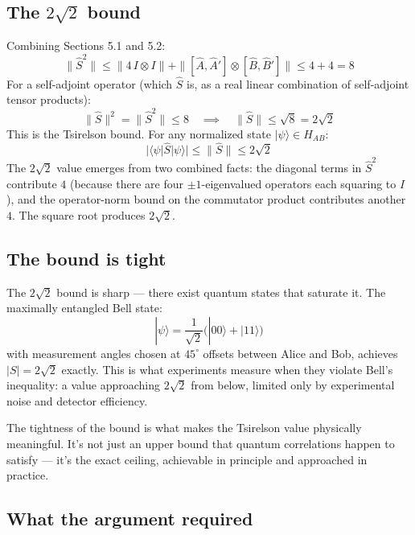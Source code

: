 \documentclass[11pt,a4paper]{article}
\begin{document}
\subsection{The $2\sqrt{2}$ bound}

Combining Sections 5.1 and 5.2:
\[
\|\hat{S}^2\| \leq \|4\, I \otimes I\| + \|[\hat{A}, \hat{A}'] \otimes [\hat{B}, \hat{B}']\| \leq 4 + 4 = 8
\]
For a self-adjoint operator (which $\hat{S}$ is, as a real linear combination of self-adjoint tensor products):
\[
\|\hat{S}\|^2 = \|\hat{S}^2\| \leq 8 \quad \implies \quad \|\hat{S}\| \leq \sqrt{8} = 2\sqrt{2}
\]
This is the Tsirelson bound. For any normalized state $|\psi\rangle \in H_{AB}$:
\[
|\langle \psi | \hat{S} | \psi \rangle| \leq \|\hat{S}\| \leq 2\sqrt{2}
\]
The $2\sqrt{2}$ value emerges from two combined facts: the diagonal terms in $\hat{S}^2$ contribute $4$ (because there are four $\pm 1$-eigenvalued operators each squaring to $I$), and the operator-norm bound on the commutator product contributes another $4$. The square root produces $2\sqrt{2}$.

\subsection{The bound is tight}

The $2\sqrt{2}$ bound is sharp --- there exist quantum states that saturate it. The maximally entangled Bell state:
\[
|\psi\rangle = \frac{1}{\sqrt{2}}\bigl(|00\rangle + |11\rangle\bigr)
\]
with measurement angles chosen at $45^\circ$ offsets between Alice and Bob, achieves $|S| = 2\sqrt{2}$ exactly. This is what experiments measure when they violate Bell's inequality: a value approaching $2\sqrt{2}$ from below, limited only by experimental noise and detector efficiency.

The tightness of the bound is what makes the Tsirelson value physically meaningful. It's not just an upper bound that quantum correlations happen to satisfy --- it's the exact ceiling, achievable in principle and approached in practice.

\subsection{What the argument required}
\end{document}
